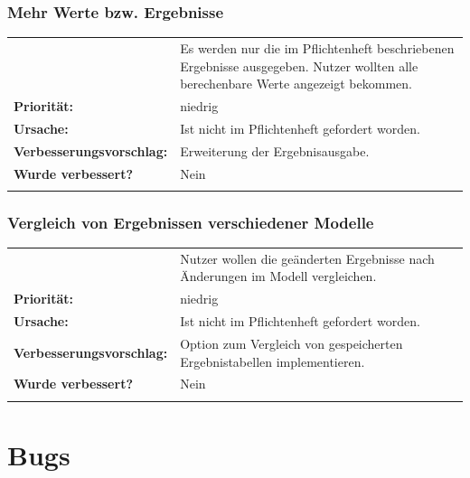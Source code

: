 \documentclass{article}
\begin{document}
\subsubsection*{Mehr Werte bzw. Ergebnisse}
\begin{tabular}{ll}
\begin{tabularx}{\textwidth}{rX}
    \textbf{Beschreibung:} & Es werden nur die im Pflichtenheft beschriebenen Ergebnisse ausgegeben. Nutzer wollten alle berechenbare Werte angezeigt bekommen.\\
    \textbf{Priorität:} & niedrig\\
    \textbf{Ursache:} & Ist nicht im Pflichtenheft gefordert worden. \\
    \textbf{Verbesserungsvorschlag:} & Erweiterung der Ergebnisausgabe.\\
    \textbf{Wurde verbessert?} & Nein\\
    \end{tabularx}
\end{tabular}

\subsubsection*{Vergleich von Ergebnissen verschiedener Modelle}
\begin{tabular}{ll}
\begin{tabularx}{\textwidth}{rX}
    \textbf{Beschreibung:} & Nutzer wollen die geänderten Ergebnisse nach Änderungen im Modell vergleichen.\\
    \textbf{Priorität:} & niedrig\\
    \textbf{Ursache:} & Ist nicht im Pflichtenheft gefordert worden. \\
    \textbf{Verbesserungsvorschlag:} & Option zum Vergleich von gespeicherten Ergebnistabellen implementieren.\\
    \textbf{Wurde verbessert?} & Nein\\
    \end{tabularx}
\end{tabular}

\newpage
\section{Bugs} \label{bugs}
\end{document}

